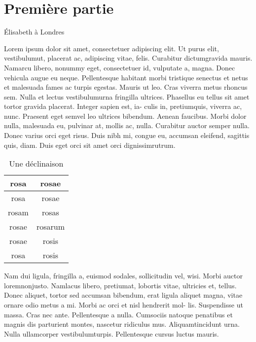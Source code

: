 \documentclass[12pt,twoside]{book}
\begin{document}
\section{Première partie}

Élisabeth à Londres 

Lorem ipsum dolor sit amet, consectetuer adipiscing elit. Ut purus elit,
vestibulumut, placerat ac, adipiscing vitae, felis. Curabitur dictumgravida
mauris. Namarcu libero, nonummy eget, consectetuer id, vulputate a, magna. Donec vehicula augue eu neque. Pellentesque habitant morbi tristique
senectus et netus et malesuada fames ac turpis egestas. Mauris ut leo. Cras
viverra metus rhoncus sem. Nulla et lectus vestibulumurna fringilla ultrices.
Phasellus eu tellus sit amet tortor gravida placerat. Integer sapien est, ia-
culis in, pretiumquis, viverra ac, nunc. Praesent eget semvel leo ultrices
bibendum. Aenean faucibus. Morbi dolor nulla, malesuada eu, pulvinar at,
mollis ac, nulla. Curabitur auctor semper nulla. Donec varius orci eget risus.
Duis nibh mi, congue eu, accumsan eleifend, sagittis quis, diam. Duis eget
orci sit amet orci dignissimrutrum.


\begin{table}[h]
  \begin{center}
    \begin{tabular}{|c|c|}
      \hline
      rosa & rosae \\
      \hline
      rosa & rosae \\
      \hline
      rosam & rosas \\
      \hline
      rosae & rosarum \\
      \hline
      rosae & rosis \\
      \hline
      rosa & rosis \\
      \hline
    \end{tabular}
  \end{center}
    \caption{Une déclinaison}
  \end{table}

Nam dui ligula, fringilla a, euismod sodales, sollicitudin vel, wisi. Morbi
auctor loremnonjusto. Namlacus libero, pretiumat, lobortis vitae, ultricies
et, tellus. Donec aliquet, tortor sed accumsan bibendum, erat ligula aliquet
magna, vitae ornare odio metus a mi. Morbi ac orci et nisl hendrerit mol-
lis. Suspendisse ut massa. Cras nec ante. Pellentesque a nulla. Cumsociis
natoque penatibus et magnis dis parturient montes, nascetur ridiculus mus.
Aliquamtincidunt urna. Nulla ullamcorper vestibulumturpis. Pellentesque
cursus luctus mauris.
\end{document}
